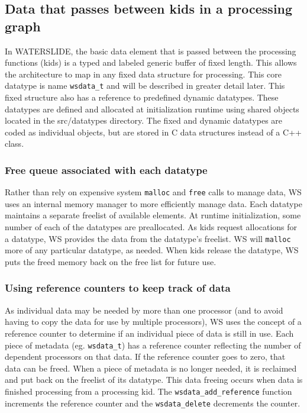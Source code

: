 \documentclass[11pt]{article}
\begin{document}
\subsection{Data that passes between kids in a processing graph}
In WATERSLIDE, the basic data element that is passed between the processing
functions (kids) is a typed and labeled generic buffer of fixed length.  This
allows the architecture to map in any fixed data structure for processing.  
This core datatype is name \texttt{wsdata\_t} and will be described in greater 
detail later.  This fixed structure also has a reference to predefined dynamic 
datatypes.   These datatypes are defined and allocated at initialization 
runtime using shared objects located in the src/datatypes directory.  The 
fixed and dynamic  datatypes are coded as individual objects, but are stored 
in C data structures instead of a C++ class.

\subsubsection{Free queue associated with each datatype}

Rather than rely on expensive system \texttt{malloc} and \texttt{free} calls to
manage data, WS uses an internal memory manager to more efficiently manage 
data.  Each datatype  maintains a separate freelist of available elements.  At 
runtime initialization,  some number of each of the datatypes are preallocated.
As kids request allocations  for a datatype, WS provides the data from the 
datatype's freelist.  WS will \texttt{malloc} more of any particular datatype, 
as needed.  When kids release the datatype, WS puts the freed memory back on 
the free list for future use. 

\subsubsection{Using reference counters to keep track of data}

As individual data may be needed by more than one processor (and to avoid 
having to copy the data for use by multiple processors), WS uses the concept 
of a reference counter to determine if an individual piece of data is
still in use.  Each piece of metadata (eg. \texttt{wsdata\_t}) has a 
reference counter reflecting the number of dependent processors on that data. 
If the reference counter goes to zero, that data can be freed. When a piece 
of metadata is no longer needed, it is reclaimed and put back on the freelist 
of its datatype. This data freeing occurs when data is finished processing 
from a processing kid. The \texttt{wsdata\_add\_reference} function increments
the reference counter and  the \texttt{wsdata\_delete} decrements 
the counter. 
\end{document}
